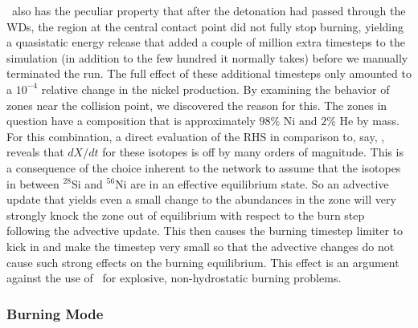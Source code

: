 \documentclass[12pt]{article}
\begin{document}


\isoseven\ also has the peculiar property that after the detonation had passed through the WDs,
the region at the central contact point did not fully stop burning, yielding a quasistatic energy
release that added a couple of million extra timesteps to the simulation (in addition to the few
hundred it normally takes) before we manually terminated the run. The full effect of these additional
timesteps only amounted to a $10^{-4}$ relative change in the nickel production. By examining the behavior
of zones near the collision point, we discovered the reason for this. The zones in question have a composition that
is approximately $98\%$ Ni and $2\%$ He by mass. For this combination, a direct evaluation of the RHS in
comparison to, say, \aproxthirteen, reveals that $dX/dt$ for these isotopes is off by many orders of magnitude.
This is a consequence of the choice inherent to the network to assume that the isotopes in between $^{28}$Si
and $^{56}$Ni are in an effective equilibrium state. So an advective update that yields even a small change
to the abundances in the zone will very strongly knock the zone out of equilibrium with respect to the burn
step following the advective update. This then causes the burning timestep limiter to kick in and make the
timestep very small so that the advective changes do not cause such strong effects on the burning equilibrium.
This effect is an argument against the use of \isoseven\ for explosive, non-hydrostatic burning problems.

\subsubsection{Burning Mode}
\label{sec:collision_parameters:burningmode}
\end{document}
